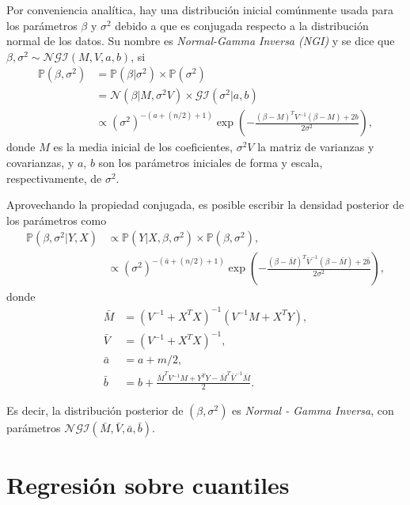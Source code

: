 Por conveniencia anal\'itica, hay una distribuci\'on inicial com\'unmente usada para los par\'ametros $\beta$ y $\sigma^2$ debido a que es conjugada respecto a la distribuci\'on normal de los datos. Su nombre es \textit{Normal-Gamma Inversa (NGI)} y se dice que $\beta,\sigma^2 \sim \mathcal{NGI}(M,V,a,b)$, si
\begin{equation*}
\begin{aligned}
    \mathbb{P}(\beta,\sigma^2) 
    &= \mathbb{P}(\beta|\sigma^2) \times \mathbb{P}(\sigma^2) \\
    &= \mathcal{N}(\beta|M, \sigma^2 V) \times \mathcal{GI}(\sigma ^2|a,b) \\
    &\propto (\sigma^2)^{-(a+(n/2)+1)} \exp\left(-\frac{(\beta-M)^TV^{-1}(\beta-M) + 2b}{2\sigma^2}\right),
\end{aligned}
\end{equation*}
donde $M$ es la media inicial de los coeficientes, $\sigma^2 V$ la matriz de varianzas y covarianzas, y $a$, $b$ son los par\'ametros iniciales de forma y escala, respectivamente, de $\sigma ^2$. 

Aprovechando la propiedad conjugada, es posible escribir la densidad posterior de los par\'ametros como
\begin{equation*}
\begin{aligned}
    \mathbb{P}(\beta,\sigma^2 | Y, X) 
    &\propto \mathbb{P}(Y| X, \beta, \sigma^2) \times \mathbb{P}(\beta, \sigma^2), \\
    &\propto (\sigma^2)^{-(\bar{a}+(n/2)+1)} \exp\left(-\frac{(\beta-\bar{M})^T\bar{V}^{-1}(\beta-\bar{M}) + 2\bar{b}}{2\sigma^2}\right),
\end{aligned}
\end{equation*}
donde
\begin{equation*}
\begin{aligned}
    \bar{M} &= (V^{-1} + X^TX)^{-1} (V^{-1}M + X^TY), \\
    \bar{V} &= (V^{-1} + X^TX)^{-1}, \\
    \bar{a} &= a + m/2, \\
    \bar{b} &= b + \frac{\bar{M}^TV^{-1}M + Y^TY - \bar{M}^T\bar{V}^{-1}\bar{M}}{2}.
\end{aligned}
\end{equation*}

Es decir, la distribuci\'on posterior de $(\beta,\sigma^2)$ es \textit{Normal - Gamma Inversa}, con par\'ametros $\mathcal{NGI}(\bar{M},\bar{V},\bar{a},\bar{b})$.

\section{Regresión sobre cuantiles}


